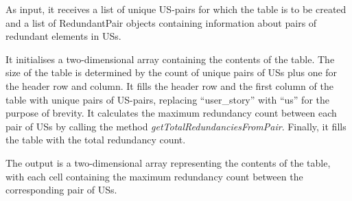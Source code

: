 \begin{enumerate}
	As input, it receives a list of unique US-pairs for which the table is to be created and a list of RedundantPair objects containing information about pairs of redundant elements in USs.
	
	It initialises a two-dimensional array containing the contents of the table. The size of the table is determined by the count of unique pairs of USs plus one for the header row and column. It fills the header row and the first column of the table with unique pairs of US-pairs, replacing \enquote{user\_story} with \enquote{us} for the purpose of brevity. It calculates the maximum redundancy count between each pair of USs by calling the method \textit{getTotalRedundanciesFromPair}. Finally, it fills the table with the total redundancy count. 
	
	The output is a two-dimensional array representing the contents of the table, with each cell containing the maximum redundancy count between the corresponding pair of USs.
		
\end{enumerate}
